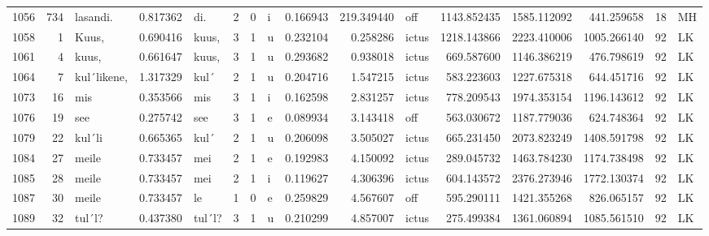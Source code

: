 \begin{tabular}{lrlrllllrrlrrrll}
1056 &         734 &         lasandi. &  0.817362 &     di. &        2 &      0 &       i &      0.166943 &    219.349440 &    off &  1143.852435 &  1585.112092 &   441.259658 &     18 &        MH \\
1058 &           1 &            Kuus, &  0.690416 &   kuus, &        3 &      1 &       u &      0.232104 &      0.258286 &  ictus &  1218.143866 &  2223.410006 &  1005.266140 &     92 &        LK \\
1061 &           4 &            kuus, &  0.661647 &   kuus, &        3 &      1 &       u &      0.293682 &      0.938018 &  ictus &   669.587600 &  1146.386219 &   476.798619 &     92 &        LK \\
1064 &           7 &      kul´likene, &  1.317329 &    kul´ &        2 &      1 &       u &      0.204716 &      1.547215 &  ictus &   583.223603 &  1227.675318 &   644.451716 &     92 &        LK \\
1073 &          16 &              mis &  0.353566 &     mis &        3 &      1 &       i &      0.162598 &      2.831257 &  ictus &   778.209543 &  1974.353154 &  1196.143612 &     92 &        LK \\
1076 &          19 &              see &  0.275742 &     see &        3 &      1 &       e &      0.089934 &      3.143418 &    off &   563.030672 &  1187.779036 &   624.748364 &     92 &        LK \\
1079 &          22 &           kul´li &  0.665365 &    kul´ &        2 &      1 &       u &      0.206098 &      3.505027 &  ictus &   665.231450 &  2073.823249 &  1408.591798 &     92 &        LK \\
1084 &          27 &            meile &  0.733457 &     mei &        2 &      1 &       e &      0.192983 &      4.150092 &  ictus &   289.045732 &  1463.784230 &  1174.738498 &     92 &        LK \\
1085 &          28 &            meile &  0.733457 &     mei &        2 &      1 &       i &      0.119627 &      4.306396 &  ictus &   604.143572 &  2376.273946 &  1772.130374 &     92 &        LK \\
1087 &          30 &            meile &  0.733457 &      le &        1 &      0 &       e &      0.259829 &      4.567607 &    off &   595.290111 &  1421.355268 &   826.065157 &     92 &        LK \\
1089 &          32 &           tul´l? &  0.437380 &  tul´l? &        3 &      1 &       u &      0.210299 &      4.857007 &  ictus &   275.499384 &  1361.060894 &  1085.561510 &     92 &        LK \\

\end{tabular}
